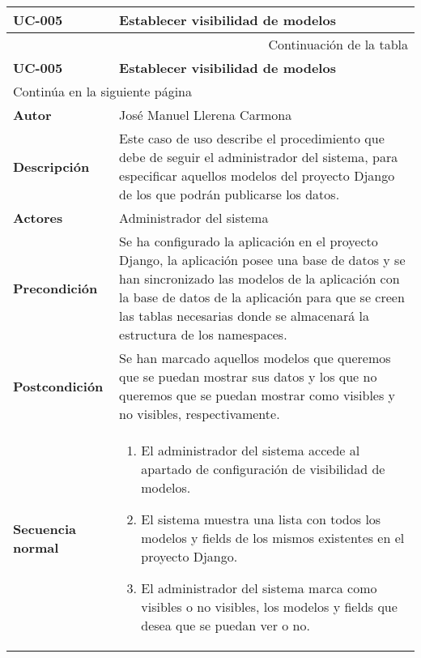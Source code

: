 \begin{center}
\begin{longtable}{||p{3.4cm}|p{12cm}||}
 \hline \hline \bf UC-005 &  \bf Establecer visibilidad de modelos \\
\hline
\endfirsthead
\hline \multicolumn{2}{|r|}{{Continuación de la tabla}} \\ \hline
 \hline \bf UC-005 &  \bf Establecer visibilidad de modelos \\
\hline
\endhead
\hline \multicolumn{2}{|l|}{{Continúa en la siguiente página}} \\ \hline
\endfoot
\endlastfoot
 \hline \bf Autor & José Manuel Llerena Carmona \\
 \hline \bf Descripción & Este caso de uso describe el procedimiento que debe
             de seguir el administrador del sistema, para especificar aquellos
             modelos del proyecto Django de los que podrán publicarse los datos.\\
 \hline \bf Actores & Administrador del sistema\\
 \hline \bf Precondición & Se ha configurado la aplicación en el proyecto
             Django, la aplicación posee una base de datos y se han sincronizado
             las modelos de la aplicación con la base de datos de la aplicación
             para que se creen las tablas necesarias donde se almacenará la
             estructura de los namespaces.\\
 \hline \bf Postcondición & Se han marcado aquellos modelos que queremos que se
             puedan mostrar sus datos y los que no queremos que se puedan
             mostrar como visibles y no visibles, respectivamente.\\
 \hline \bf Secuencia normal & 
             \begin{enumerate}
                \item El administrador del sistema accede al apartado de
                       configuración de visibilidad de modelos.
                \item El sistema muestra una lista con todos los modelos y
                       fields de los mismos existentes en el proyecto Django.
                \item El administrador del sistema marca como visibles o no
                       visibles, los modelos y fields que desea que se puedan
                       ver o no.

\end{enumerate}
\end{longtable}
\end{center}
